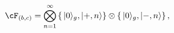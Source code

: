 \begin{equation}
\cF_{(b,c)} = \bigotimes_{n=1}^{\infty} \left\{ \, |0 \rangle_g, |+,n \rangle \right\} \otimes \{ \, |0 \rangle_g, |-,n \rangle \} \,,
\label{ghostdecom}
\end{equation}

